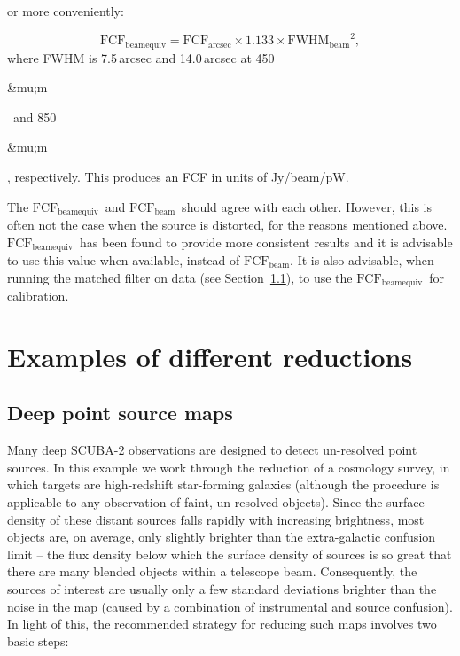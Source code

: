 \documentclass[twoside,11pt]{article}
\newcommand{\micron}{\mbox{\,${\umu}$m}}            %
\newcommand{\xlabel}[1]{}
\renewcommand{\_}{\texttt{\symbol{95}}}
\newcommand{\fcfbe}{$\mathrm{FCF_{beamequiv}}$}
\newcommand{\fcfb}{$\mathrm{FCF_{beam}}$}
\renewcommand{\micron}{\begin{rawhtml}&mu;m\end{rawhtml}}
\begin{document}
\begin{itemize}
 or more conveniently:

\begin{equation}
\mathrm{FCF_{beamequiv}} = \mathrm{FCF_{arcsec}} \times 1.133 \times
\mathrm{FWHM_{beam}}^2,
\end{equation}
where FWHM is 7.5\,arcsec and 14.0\,arcsec at 450\micron\ and
850\micron, respectively. This produces an FCF in units of
Jy/beam/pW.

The \fcfbe\ and \fcfb\ should agree
with each other. However, this is often not the case when the source
is distorted, for the reasons mentioned
above. \fcfbe\ has been found to provide more
consistent results and it is advisable to use this value when
available, instead of \fcfb. It is also advisable,
when running the matched filter on data (see
Section~\ref{sec:cosmology}), to use the \fcfbe\
for calibration.

\end{itemize}


\section{\xlabel{Examples}Examples of different reductions}
\label{sec:eg}

\subsection{\xlabel{Cosmology}Deep point source maps}
\label{sec:cosmology}

Many deep SCUBA-2 observations are designed to detect un-resolved
point sources. In this example we work through the reduction of a
cosmology survey, in which targets are high-redshift star-forming
galaxies (although the procedure is applicable to any observation of
faint, un-resolved objects).  Since the surface density of these
distant sources falls rapidly with increasing brightness, most objects
are, on average, only slightly brighter than the extra-galactic
confusion limit -- the flux density below which the surface density of
sources is so great that there are many blended objects within a
telescope beam. Consequently, the sources of interest are usually only
a few standard deviations brighter than the noise in the map (caused
by a combination of instrumental and source confusion). In light of
this, the recommended strategy for reducing such maps involves two
basic steps:
\end{document}
